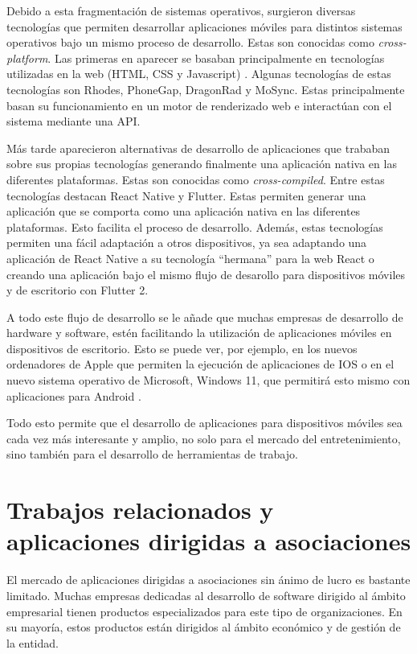 Debido a esta fragmentación de sistemas operativos, surgieron diversas tecnologías que permiten desarrollar aplicaciones móviles para distintos sistemas operativos bajo un mismo proceso de desarrollo. Estas son conocidas como \textit{cross-platform}. Las primeras en aparecer se basaban principalmente en tecnologías utilizadas en la web (HTML, CSS y Javascript) \cite{palmieri2012comparison}. Algunas tecnologías de estas tecnologías son Rhodes, PhoneGap, DragonRad y MoSync. Estas principalmente basan su funcionamiento en un motor de renderizado web e interactúan con el sistema mediante una API. 

Más tarde aparecieron alternativas de desarrollo de aplicaciones que trababan sobre sus propias tecnologías generando finalmente una aplicación nativa en las diferentes plataformas. Estas son conocidas como \textit{cross-compiled}. Entre estas tecnologías destacan React Native y Flutter. Estas permiten generar una aplicación que se comporta como una aplicación nativa en las diferentes plataformas. Esto facilita el proceso de desarrollo. Además, estas tecnologías permiten una fácil adaptación a otros dispositivos, ya sea adaptando una aplicación de React Native a su tecnología ``hermana'' para la web React o creando una aplicación bajo el mismo flujo de desarollo para dispositivos móviles y de escritorio con Flutter 2. 

A todo este flujo de desarrollo se le añade que muchas empresas de desarrollo de hardware y software, estén facilitando la utilización de aplicaciones móviles en dispositivos de escritorio. Esto se puede ver, por ejemplo, en los nuevos ordenadores de Apple que permiten la ejecución de aplicaciones de IOS \cite{macos-ios} o en el nuevo sistema operativo de Microsoft, Windows 11, que permitirá esto mismo con aplicaciones para Android \cite{windows-android}.

Todo esto permite que el desarrollo de aplicaciones para dispositivos móviles sea cada vez más interesante y amplio, no solo para el mercado del entretenimiento, sino también para el desarrollo de herramientas de trabajo.

\section{Trabajos relacionados y aplicaciones dirigidas a asociaciones}

El mercado de aplicaciones dirigidas a asociaciones sin ánimo de lucro es bastante limitado. Muchas empresas dedicadas al desarrollo de software dirigido al ámbito empresarial tienen productos especializados para este tipo de organizaciones. En su mayoría, estos productos están dirigidos al ámbito económico y de gestión de la entidad. 

